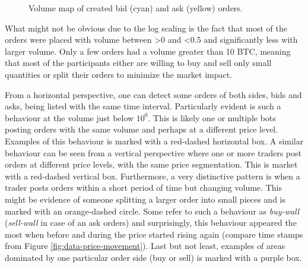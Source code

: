\begin{figure}[H]
    \centering
    \caption{Volume map of created bid (cyan) and ask (yellow) orders.}
    \label{fig:data-volmap-crated}
\end{figure}

What might not be obvious due to the log scaling is the fact that most of the orders were placed with volume between >0 and <0.5 and significantly less with larger volume.
Only a few orders had a volume greater than 10 BTC, meaning that most of the participants either are willing to buy and sell only small quantities or split their orders to minimize the market impact.

From a horizontal perspective, one can detect some orders of both sides, bids and asks, being listed with the same time interval.
Particularly evident is such a behaviour at the volume just below $10^0$.
This is likely one or multiple bots posting orders with the same volume and perhaps at a different price level.
Examples of this behaviour is marked with a red-dashed horizontal box.
A similar behaviour can be seen from a vertical perspective where one or more traders post orders at different price levels, with the same price segmentation.
This is market with a red-dashed vertical box.
Furthermore, a very distinctive pattern is when a trader posts orders within a short period of time but changing volume.
This might be evidence of someone splitting a larger order into small pieces and is marked with an orange-dashed circle.
Some refer to such a behaviour as \textit{buy-wall} (\textit{sell-wall} in case of an ask orders) and surprisingly, this behaviour appeared the most when before and during the price started rising again (compare time stamps from Figure \ref{fig:data-price-movement}).
Last but not least, examples of areas dominated by one particular order side (buy or sell) is marked with a purple box.

